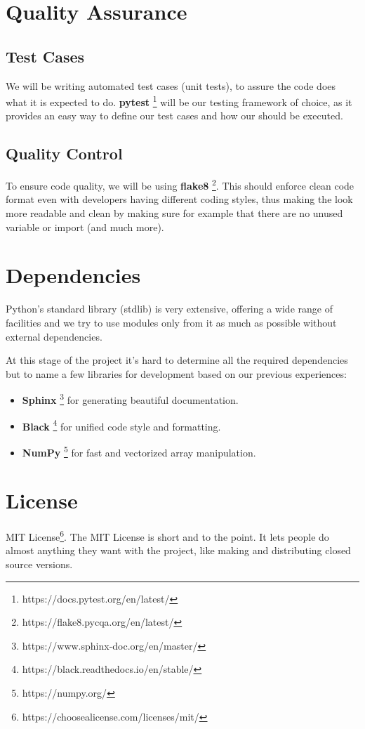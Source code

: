 \documentclass[a4paper,12pt]{extarticle}
\begin{document}
\section{Quality Assurance}
    \subsection{Test Cases}
        We will be writing automated test cases (unit tests), to assure the code does what it is expected to do. \textbf{pytest} \footnote{https://docs.pytest.org/en/latest/} will be our testing framework of choice, as it provides an easy way to define our test cases and how our should be executed.
    \subsection{Quality Control}
        To ensure code quality, we will be using \textbf{flake8} \footnote{https://flake8.pycqa.org/en/latest/}. This should enforce clean code format even with developers having different coding styles, thus making the look more readable and clean by making sure for example that there are no unused variable or import (and much more).
\section{Dependencies}
Python’s standard library (stdlib) is very extensive, offering a wide range of facilities and we try to use modules only from it as much as possible without external dependencies. \par At this stage of the project it's hard to determine all the required dependencies but to name a few libraries for development based on our previous experiences:
\begin{itemize}
    \item \textbf{Sphinx} \footnote{https://www.sphinx-doc.org/en/master/} for generating beautiful documentation.
    \item \textbf{Black} \footnote{https://black.readthedocs.io/en/stable/} for unified code style and formatting.
    \item \textbf{NumPy} \footnote{https://numpy.org/} for fast and vectorized array manipulation.
\end{itemize}
\section{License}
MIT License\footnote{https://choosealicense.com/licenses/mit/}.  The MIT License is short and to the point. It lets people do almost anything they want with the project, like making and distributing closed source versions. 
\end{document}
